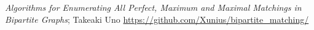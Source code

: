 \begin{thebibliography}{99}
 \emph{Algorithms for Enumerating All Perfect, Maximum and Maximal Matchings in Bipartite Graphs}; Takeaki Uno
 \url{https://github.com/Xunius/bipartite\_matching/}
\end{thebibliography}